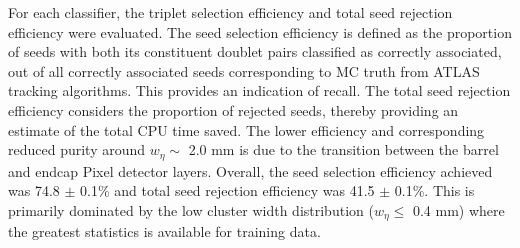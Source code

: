 For each classifier, the triplet selection efficiency and total seed rejection efficiency were evaluated. The seed selection efficiency is defined as the proportion of seeds with both its constituent doublet pairs classified as correctly associated, out of all correctly associated seeds corresponding to MC truth from ATLAS tracking algorithms. This provides an indication of recall. The total seed rejection efficiency considers the proportion of rejected seeds, thereby providing an estimate of the total CPU time saved. The lower efficiency and corresponding reduced purity around $w_{\eta} \sim$ 2.0 mm is due to the transition between the barrel and endcap Pixel detector layers. Overall, the seed selection efficiency achieved was 74.8 $\pm$ 0.1\% and total seed rejection efficiency was 41.5 $\pm$ 0.1\%. This is primarily dominated by the low cluster width distribution ($w_{\eta} \leq$ 0.4 mm) where the greatest statistics is available for training data.




